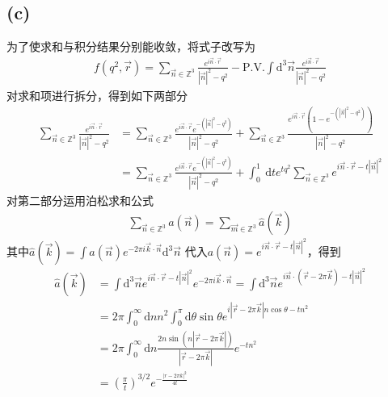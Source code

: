 \documentclass{article}
\numberwithin{equation}{section}
\begin{document}
\subsection*{(c)}
为了使求和与积分结果分别能收敛，将式子改写为
\begin{align}
    f\left(q^2,\vec{r}\right)=\sum_{\vec{n} \in \mathbb{Z}^{3}} \frac{e^{i \vec{n} \cdot \vec{r}}}{|\vec{n}|^{2}-q^{2}}-\text{P.V.} \int \mathrm{d}^{3} \vec{n} \frac{e^{i \vec{n} \cdot \vec{r}}}{|\vec{n}|^{2}-q^{2}}
\end{align}
对求和项进行拆分，得到如下两部分
\begin{align}
    \sum_{\vec{n} \in \mathbb{Z}^{3}} \frac{e^{i \vec{n} \cdot \vec{r}}}{|\vec{n}|^{2}-q^{2}} & =\sum_{\vec{n} \in \mathbb{Z}^{3}} \frac{e^{i \vec{n} \cdot \vec{r}} e^{-\left(|\vec{n}|^{2}-q^{2}\right)}}{|\vec{n}|^{2}-q^{2}}+\sum_{\vec{n} \in \mathbb{Z}^{3}} \frac{e^{i \vec{n} \cdot \vec{r}}\left(1-e^{-\left(|\vec{n}|^{2}-q^{2}\right)}\right)}{|\vec{n}|^{2}-q^{2}} \\
                                                                                              & =\sum_{\vec{n} \in \mathbb{Z}^{3}} \frac{e^{i \vec{n} \cdot \vec{r}} e^{-\left(|\vec{n}|^{2}-q^{2}\right)}}{|\vec{n}|^{2}-q^{2}}+\int_{0}^{1} \mathrm{~d} t e^{t q^{2}} \sum_{\vec{n} \in \mathbb{Z}^{3}} e^{i \vec{n} \cdot \vec{r}-t|\vec{n}|^{2}}
\end{align}
对第二部分运用泊松求和公式
\begin{align}
    \sum_{\vec{n} \in \mathbb{Z}^{3}} a(\vec{n})=\sum_{\vec{m} \in \mathbb{Z}^{3}} \hat{a}(\vec{k})
\end{align}
其中$\hat{a}(\vec{k})=\int a(\vec{n}) e^{-2\pi i\vec{k} \cdot \vec{n}}\mathrm{d}^{3}\vec{n} $
代入$a(\vec{n})=e^{i \vec{n} \cdot \vec{r}-t|\vec{n}|^{2}}$，得到
\begin{align}
    \hat{a}(\vec{k}) & =\int \mathrm{d}^{3} \vec{n} e^{i \vec{n} \cdot \vec{r}-t|\vec{n}|^{2}} e^{-2\pi i\vec{k}\cdot\vec{n}}=\int \mathrm{d}^{3} \vec{n} e^{i \vec{n} \cdot(\vec{r}-2\pi\vec{k})-t|\vec{n}|^{2}} \\
                     & =2 \pi \int_{0}^{\infty} \mathrm{d} n n^{2} \int_{0}^{\pi} \mathrm{d}\theta\sin\theta e^{i|\vec{r}-2\pi\vec{k}|n\cos\theta-t n^{2}}                                                        \\
                     & =2 \pi \int_{0}^{\infty} \mathrm{d} n  \frac{2n \sin (n|\vec{r}-2 \pi \vec{k}|)}{|\vec{r}-2 \pi \vec{k}|} e^{-t n^{2}}                                                                     \\
                     & =\left(\frac{\pi}{t}\right)^{3 / 2} e^{-\frac{|r-2 \pi k|^{2}}{4 t}}
\end{align}
\end{document}
